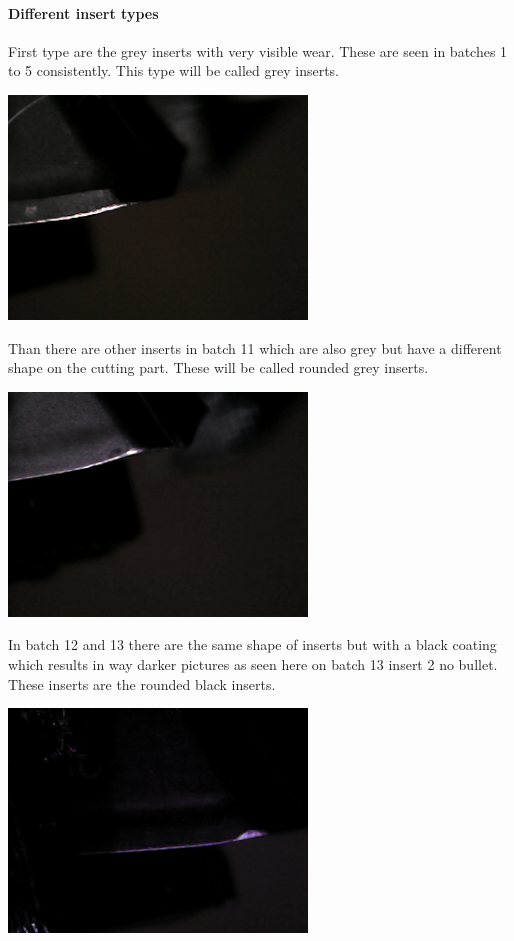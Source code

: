 \paragraph{Different insert types}

First type are the grey inserts with very visible wear. These are seen in batches 1 to 5 consistently. This type will be called grey inserts.

\includegraphics[width=3.125000in, keepaspectratio=true]{./fig/Vision/Dataset/automated_datasets/2_created_datasets/2_Spaghetti_dataset/gray_b_003_p_004_l_006-011_white_nb.png}



Than there are other inserts in batch 11 which are also grey but have a different shape on the cutting part. These will be called rounded grey inserts.

\includegraphics[width=3.125000in, keepaspectratio=true]{./fig/Vision/Dataset/automated_datasets/2_created_datasets/2_Spaghetti_dataset/rounded_grey_b_011_p_008_l_006-011_white_nb.png}

In batch 12 and 13 there are the same shape of inserts but with a black coating which results in way darker pictures as seen here on batch 13 insert 2 no bullet. These inserts are the rounded black inserts.

\includegraphics[width=3.125000in, keepaspectratio=true]{./fig/Vision/Dataset/automated_datasets/2_created_datasets/2_Spaghetti_dataset/rounded_black_b_013_p_002_l_006-011_white_nb.png}



